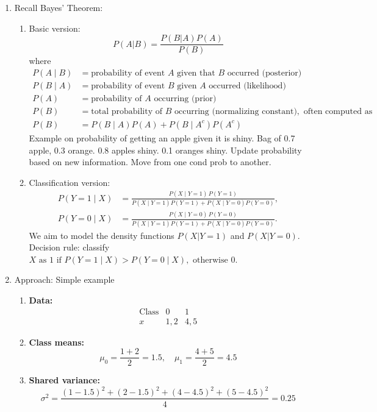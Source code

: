 \documentclass{article}
\begin{document}
\begin{enumerate}
\item Recall Bayes' Theorem:
\begin{enumerate}
\item Basic version: 
\[
P(A | B) = \frac{P(B|A) P(A)}{P(B)}
\]
where
\begin{align*}
P(A \mid B) &= \text{probability of event $A$ given that $B$ occurred (posterior)} \\
P(B \mid A) &= \text{probability of event $B$ given $A$ occurred (likelihood)} \\
P(A) &= \text{probability of $A$ occurring (prior)} \\
P(B) &= \text{total probability of $B$ occurring (normalizing constant)}, \text{ often computed as} \\
P(B) &= P(B \mid A) P(A) + P(B \mid A^c) P(A^c)
\end{align*}
Example on probability of getting an apple given it is shiny. Bag of 0.7 apple, 0.3 orange. 0.8 apples shiny. 0.1 oranges shiny. Update probability based on new information. Move from one cond prob to another.
\item Classification version:
\begin{align*}
P(Y=1 \mid X) &= \frac{P(X \mid Y=1) \, P(Y=1)}
{P(X \mid Y=1) P(Y=1) + P(X \mid Y=0) P(Y=0)}, \\
P(Y=0 \mid X) &= \frac{P(X \mid Y=0) \, P(Y=0)}
{P(X \mid Y=1) P(Y=1) + P(X \mid Y=0) P(Y=0)}.
\end{align*}
We aim to model the density functions $P(X | Y=1)$ and $P(X | Y=0)$. 
Decision rule: classify $X \text{ as 1 if } P(Y=1 \mid X) > P(Y=0 \mid X), \text{ otherwise 0.}$
\end{enumerate}

\item Approach: Simple example
\begin{enumerate}
    \item \textbf{Data:}
    \[
    \begin{array}{c|cc}
    \text{Class} & 0 & 1 \\
    \hline
    x & 1, 2 & 4, 5
    \end{array}
    \]

    \item \textbf{Class means:}
    \[
    \mu_0 = \frac{1+2}{2} = 1.5, \quad 
    \mu_1 = \frac{4+5}{2} = 4.5
    \]

    \item \textbf{Shared variance:}
    \[
    \sigma^2 = \frac{(1-1.5)^2 + (2-1.5)^2 + (4-4.5)^2 + (5-4.5)^2}{4} = 0.25
    \]


\end{enumerate}
\end{enumerate}
\end{document}
